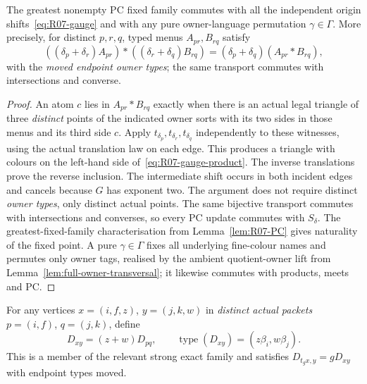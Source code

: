 \begin{lemma}
\label{lem:R07-PC-gauge}
The greatest nonempty PC fixed family commutes with all the
independent origin shifts~\eqref{eq:R07-gauge} and with any
pure owner-language permutation $\gamma\in\Gamma$.  More
precisely, for distinct $p,r,q$, typed menus $A_{pr},B_{rq}$ satisfy
\begin{equation}\label{eq:R07-gauge-product}
 ((\delta_p+\delta_r)A_{pr})*((\delta_r+\delta_q)B_{rq})
 =(\delta_p+\delta_q)(A_{pr}*B_{rq}),
\end{equation}
with the \emph{moved endpoint owner types}; the same transport
commutes with intersections and converse.
\end{lemma}
\begin{proof}
An atom $c$ lies in $A_{pr}*B_{rq}$ exactly when there is
an actual legal triangle of three \emph{distinct} points of the
indicated owner sorts with its two sides in those menus and
its third side $c$.  Apply $t_{\delta_p},t_{\delta_r},
t_{\delta_q}$ independently to these witnesses, using the
actual translation law on each edge.  This produces a triangle
with colours on the left-hand side of~\eqref{eq:R07-gauge-product}.
The inverse translations prove the reverse inclusion.
The intermediate shift occurs in both incident edges and cancels
because $G$ has exponent two.  The argument does not require
distinct \emph{owner types}, only distinct actual points.
The same bijective transport commutes with intersections and
converses, so every PC update commutes with $S_\delta$.
The greatest-fixed-family characterisation from
Lemma~\ref{lem:R07-PC} gives naturality of the fixed point.
A pure $\gamma\in\Gamma$ fixes all underlying fine-colour
names and permutes only owner tags, realised by the ambient
quotient-owner lift from
Lemma~\ref{lem:full-owner-transversal}; it likewise commutes
with products, meets and PC.
\end{proof}

For any vertices $x=(i,f,z)$, $y=(j,k,w)$ in \emph{distinct
actual packets} $p=(i,f)$, $q=(j,k)$, define
\begin{equation}\label{eq:R07-moving-domain}
 D_{xy}=(z+w)D_{pq},\qquad
 \operatorname{type}(D_{xy})=(z\beta_i,w\beta_j).
\end{equation}
This is a member of the relevant strong exact family and
satisfies $D_{t_gx,y}=gD_{xy}$ with endpoint types moved.

